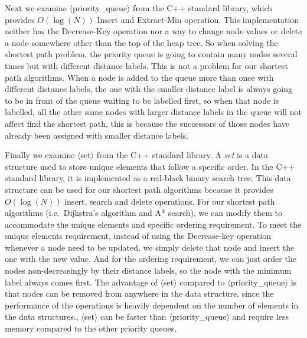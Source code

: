 Next we examine $\langle$priority\_queue$\rangle$ from the C++ standard library,
which provides $O(\log(N))$ Insert and Extract-Min operation.
This implementation neither has the Decrease-Key operation nor a way to change node values or delete a node somewhere other than the top of the heap tree.
So when solving the shortest path problem,
the priority queue is going to contain many nodes several times but with different distance labels.
This is not a problem for our shortest path algorithms.
When a node is added to the queue more than once with different distance labels,
the one with the smaller distance label is always going to be in front of the queue waiting to be labelled first,
so when that node is labelled,
all the other same nodes with larger distance labels in the queue will not affect find the shortest path,
this is because the successors of those nodes have already been assigned with smaller distance labels.

Finally we examine $\langle$set$\rangle$ from the C++ standard library.
A \emph{set} is a data structure used to store unique elements that follow a specific order.
In the C++ standard library, it is implemented as a red-black binary search tree.
This data structure can be used for our shortest path algorithms because it provides $O(\log(N))$ insert, search and delete operations.
For our shortest path algorithms (i.e.\ Dijkstra's algorithm and A* search),
we can modify them to accommodate the unique elements and specific ordering requirement.
To meet the unique elements requirement,
instead of using the Decrease-key operation whenever a node need to be updated,
we simply delete that node and insert the one with the new value.
And for the ordering requirement,
we can just order the nodes non-decreasingly by their distance labels,
so the node with the minimum label always comes first.
The advantage of $\langle$set$\rangle$ compared to $\langle$priority\_queue$\rangle$ is that nodes can be removed from anywhere in the data structure,
since the performance of the operations is heavily dependent on the number of elements in the data structures.,
$\langle$set$\rangle$ can be faster than $\langle$priority\_queue$\rangle$ and require less memory compared to the other priority queues.

